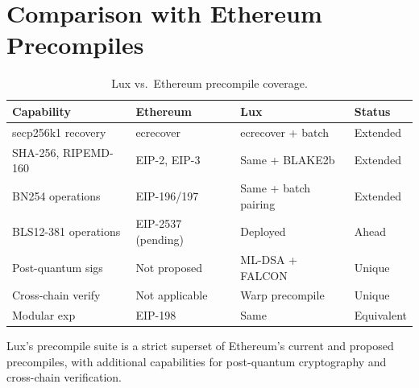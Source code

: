\section{Comparison with Ethereum Precompiles}
\label{sec:comparison}

\begin{table}[H]
\centering
\caption{Lux vs.\ Ethereum precompile coverage.}
\label{tab:eth_comparison}
\begin{tabular}{llll}
\toprule
\textbf{Capability} & \textbf{Ethereum} & \textbf{Lux} & \textbf{Status} \\
\midrule
secp256k1 recovery & ecrecover & ecrecover + batch & Extended \\
SHA-256, RIPEMD-160 & EIP-2, EIP-3 & Same + BLAKE2b & Extended \\
BN254 operations & EIP-196/197 & Same + batch pairing & Extended \\
BLS12-381 operations & EIP-2537 (pending) & Deployed & Ahead \\
Post-quantum sigs & Not proposed & ML-DSA + FALCON & Unique \\
Cross-chain verify & Not applicable & Warp precompile & Unique \\
Modular exp & EIP-198 & Same & Equivalent \\
\bottomrule
\end{tabular}
\end{table}

Lux's precompile suite is a strict superset of Ethereum's current and proposed precompiles, with additional capabilities for post-quantum cryptography and cross-chain verification.

